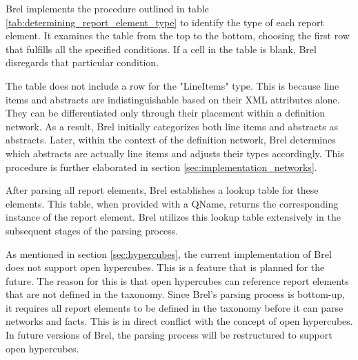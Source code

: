 


Brel implements the procedure outlined in table \ref{tab:determining_report_element_type} to identify the type of each report element.
It examines the table from the top to the bottom, choosing the first row that fulfills all the specified conditions.
If a cell in the table is blank, Brel disregards that particular condition.

The table does not include a row for the "LineItems" type.
This is because line items and abstracts are indistinguishable based on their XML attributes alone.
They can be differentiated only through their placement within a definition network.
As a result, Brel initially categorizes both line items and abstracts as abstracts.
Later, within the context of the definition network, Brel determines which abstracts are actually line items and adjusts their types accordingly.
This procedure is further elaborated in section \ref{sec:implementation_networks}.

After parsing all report elements, Brel establishes a lookup table for these elements.
This table, when provided with a QName, returns the corresponding instance of the report element.
Brel utilizes this lookup table extensively in the subsequent stages of the parsing process.

As mentioned in section \ref{sec:hypercubes}, the current implementation of Brel does not support open hypercubes.
This is a feature that is planned for the future.
The reason for this is that open hypercubes can reference report elements that are not defined in the taxonomy.
Since Brel's parsing process is bottom-up, it requires all report elements to be defined in the taxonomy before it can parse networks and facts.
This is in direct conflict with the concept of open hypercubes.
In future versions of Brel, the parsing process will be restructured to support open hypercubes.

